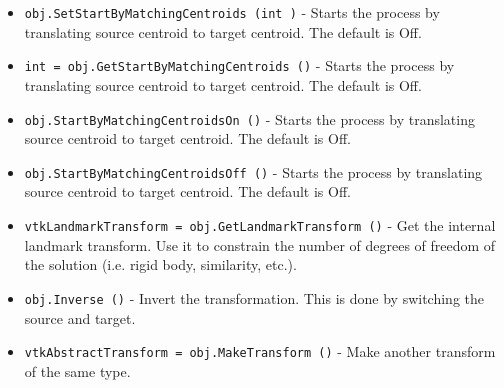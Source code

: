 \begin{itemize}
\item  \verb|obj.SetStartByMatchingCentroids (int )| -  Starts the process by translating source centroid to target centroid.
 The default is Off.

\item  \verb|int = obj.GetStartByMatchingCentroids ()| -  Starts the process by translating source centroid to target centroid.
 The default is Off.

\item  \verb|obj.StartByMatchingCentroidsOn ()| -  Starts the process by translating source centroid to target centroid.
 The default is Off.

\item  \verb|obj.StartByMatchingCentroidsOff ()| -  Starts the process by translating source centroid to target centroid.
 The default is Off.

\item  \verb|vtkLandmarkTransform = obj.GetLandmarkTransform ()| -  Get the internal landmark transform. Use it to constrain the number of
 degrees of freedom of the solution (i.e. rigid body, similarity, etc.).

\item  \verb|obj.Inverse ()| -  Invert the transformation.  This is done by switching the
 source and target.

\item  \verb|vtkAbstractTransform = obj.MakeTransform ()| -  Make another transform of the same type.

\end{itemize}
